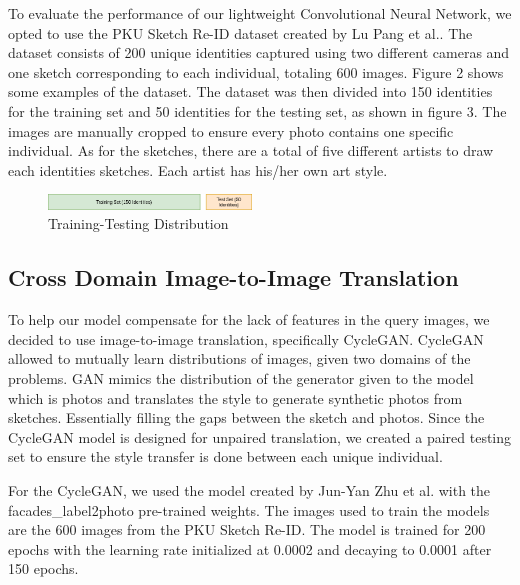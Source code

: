 \documentclass[conference]{IEEEtran}
\begin{document}
    \vspace{1ex}
	
	To evaluate the performance of our lightweight Convolutional Neural Network, we opted to use the PKU Sketch Re-ID dataset created by Lu Pang et al.. The dataset consists of 200 unique identities captured using two different cameras and one sketch corresponding to each individual, totaling 600 images. Figure 2 shows some examples of the dataset. The dataset was then divided into 150 identities for the training set and 50 identities for the testing set, as shown in figure 3. The images are manually cropped to ensure every photo contains one specific individual. As for the sketches, there are a total of five different artists to draw each identities sketches. Each artist has his/her own art style. 
	
	\begin{figure}[h!] \centering
		\includegraphics[width=0.48\textwidth]{img/TraintestSplit.png}
		\caption{Training-Testing Distribution}
		\label{fig:3}
	\end{figure}
	
	\vspace{1ex}
	
	\subsection{Cross Domain Image-to-Image Translation}
	\vspace{1ex}
	
	To help our model compensate for the lack of features in the query images, we decided to use image-to-image translation, specifically CycleGAN. CycleGAN allowed to mutually learn distributions of images, given two domains of the problems. GAN mimics the distribution of the generator given to the model which is photos and translates the style to generate synthetic photos from sketches. Essentially filling the gaps between the sketch and photos. Since the CycleGAN model is designed for unpaired translation, we created a paired testing set to ensure the style transfer is done between each unique individual. 
	
	For the CycleGAN, we used the model created by Jun-Yan Zhu et al. with the facades\_label2photo pre-trained weights. The images used to train the models are the 600 images from the PKU Sketch Re-ID. The model is trained for 200 epochs with the learning rate initialized at 0.0002 and decaying to 0.0001 after 150 epochs.
	
\end{document}

